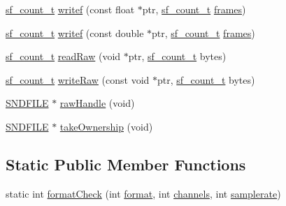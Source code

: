 \begin{DoxyCompactItemize}
\item 
\mbox{\hyperlink{sndfile_8h_af2b12fded74bc949f1f1f392a2af4892}{sf\+\_\+count\+\_\+t}} \mbox{\hyperlink{class_sndfile_handle_a8f862bf6d6d48246fa5cbb46464bf4c2}{writef}} (const float $\ast$ptr, \mbox{\hyperlink{sndfile_8h_af2b12fded74bc949f1f1f392a2af4892}{sf\+\_\+count\+\_\+t}} \mbox{\hyperlink{class_sndfile_handle_a12c7de95fd3134419bf755020d5a018c}{frames}})
\item 
\mbox{\hyperlink{sndfile_8h_af2b12fded74bc949f1f1f392a2af4892}{sf\+\_\+count\+\_\+t}} \mbox{\hyperlink{class_sndfile_handle_a96ff069df0294554fb906a8b04bad662}{writef}} (const double $\ast$ptr, \mbox{\hyperlink{sndfile_8h_af2b12fded74bc949f1f1f392a2af4892}{sf\+\_\+count\+\_\+t}} \mbox{\hyperlink{class_sndfile_handle_a12c7de95fd3134419bf755020d5a018c}{frames}})
\item 
\mbox{\hyperlink{sndfile_8h_af2b12fded74bc949f1f1f392a2af4892}{sf\+\_\+count\+\_\+t}} \mbox{\hyperlink{class_sndfile_handle_a5dfeda9653d5c9c70552fb67f60d52c4}{read\+Raw}} (void $\ast$ptr, \mbox{\hyperlink{sndfile_8h_af2b12fded74bc949f1f1f392a2af4892}{sf\+\_\+count\+\_\+t}} bytes)
\item 
\mbox{\hyperlink{sndfile_8h_af2b12fded74bc949f1f1f392a2af4892}{sf\+\_\+count\+\_\+t}} \mbox{\hyperlink{class_sndfile_handle_a2557a434e75581b864635088f9de4ee5}{write\+Raw}} (const void $\ast$ptr, \mbox{\hyperlink{sndfile_8h_af2b12fded74bc949f1f1f392a2af4892}{sf\+\_\+count\+\_\+t}} bytes)
\item 
\mbox{\hyperlink{sndfile_8h_ac14209bc83d532b06a8cdf9ade6d544a}{S\+N\+D\+F\+I\+LE}} $\ast$ \mbox{\hyperlink{class_sndfile_handle_a605153c4c3e84557cd60eb3978fc8539}{raw\+Handle}} (void)
\item 
\mbox{\hyperlink{sndfile_8h_ac14209bc83d532b06a8cdf9ade6d544a}{S\+N\+D\+F\+I\+LE}} $\ast$ \mbox{\hyperlink{class_sndfile_handle_a9461ef4669a8df24945e846fb28875b2}{take\+Ownership}} (void)
\end{DoxyCompactItemize}
\subsection*{Static Public Member Functions}
\begin{DoxyCompactItemize}
\item 
static int \mbox{\hyperlink{class_sndfile_handle_aeffce59efad6081b25cd1bb24bf37ef1}{format\+Check}} (int \mbox{\hyperlink{class_sndfile_handle_a72b47b9aee449744817a2d6d702ab457}{format}}, int \mbox{\hyperlink{class_sndfile_handle_a710add6f87468ca8f9dc444bf35e7ebc}{channels}}, int \mbox{\hyperlink{class_sndfile_handle_aa4db003e80513fff2f861cc17d459911}{samplerate}})
\end{DoxyCompactItemize}


